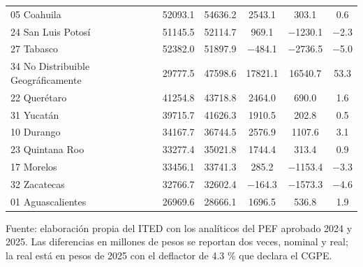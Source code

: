 \begin{longtable}{L{4.2cm}SSSSS}
{05 Coahuila} & \num{52093.1} & \num{54636.2} & \num{2543.1} & \num{303.1} & \num{0.6} \\
{24 San Luis Potosí} & \num{51145.5} & \num{52114.7} & \num{969.1} & \num{-1230.1} & \num{-2.3} \\
{27 Tabasco} & \num{52382.0} & \num{51897.9} & \num{-484.1} & \num{-2736.5} & \num{-5.0} \\
{34 No Distribuible Geográficamente} & \num{29777.5} & \num{47598.6} & \num{17821.1} & \num{16540.7} & \num{53.3} \\
{22 Querétaro} & \num{41254.8} & \num{43718.8} & \num{2464.0} & \num{690.0} & \num{1.6} \\
{31 Yucatán} & \num{39715.7} & \num{41626.3} & \num{1910.5} & \num{202.8} & \num{0.5} \\
{10 Durango} & \num{34167.7} & \num{36744.5} & \num{2576.9} & \num{1107.6} & \num{3.1} \\
{23 Quintana Roo} & \num{33277.4} & \num{35021.8} & \num{1744.4} & \num{313.4} & \num{0.9} \\
{17 Morelos} & \num{33456.1} & \num{33741.3} & \num{285.2} & \num{-1153.4} & \num{-3.3} \\
{32 Zacatecas} & \num{32766.7} & \num{32602.4} & \num{-164.3} & \num{-1573.3} & \num{-4.6} \\
{01 Aguascalientes} & \num{26969.6} & \num{28666.1} & \num{1696.5} & \num{536.8} & \num{1.9} \\
\end{longtable}
\par\vspace{2pt}\footnotesize Fuente: elaboración propia del ITED con los analíticos del PEF aprobado 2024 y 2025. Las diferencias en millones de pesos se reportan dos veces, nominal y real; la real está en pesos de 2025 con el deflactor de 4.3 \% que declara el CGPE.
\normalsize
